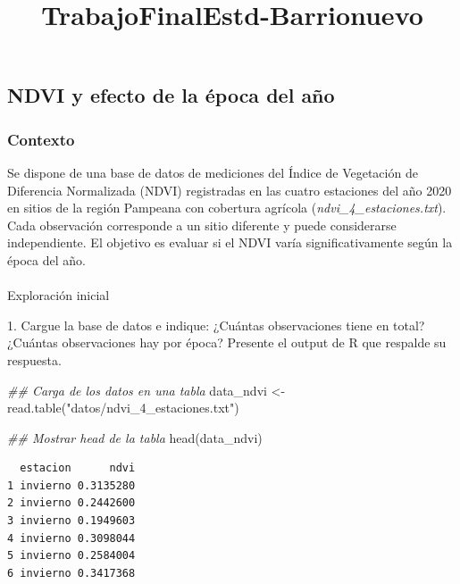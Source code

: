 \documentclass[
  letterpaper,
  DIV=11,
  numbers=noendperiod]{scrartcl}
\title{TrabajoFinalEstd-Barrionuevo}
\author{}
\date{}
\makeatletter
\let\oldparagraph\paragraph
\renewcommand{\paragraph}{
    \@ifstar
      \xxxParagraphStar
      \xxxParagraphNoStar
  }
\newcommand{\xxxParagraphStar}[1]{\oldparagraph*{#1}\mbox{}}
\newcommand{\xxxParagraphNoStar}[1]{\oldparagraph{#1}\mbox{}}
\newenvironment{Shaded}{\begin{snugshade}}{\end{snugshade}}
\newcommand{\DocumentationTok}[1]{\textcolor[rgb]{0.37,0.37,0.37}{\textit{#1}}}
\newcommand{\FunctionTok}[1]{\textcolor[rgb]{0.28,0.35,0.67}{#1}}
\newcommand{\NormalTok}[1]{\textcolor[rgb]{0.00,0.23,0.31}{#1}}
\newcommand{\OtherTok}[1]{\textcolor[rgb]{0.00,0.23,0.31}{#1}}
\newcommand{\StringTok}[1]{\textcolor[rgb]{0.13,0.47,0.30}{#1}}
\makeatother
\begin{document}
\maketitle


\subsection{NDVI y efecto de la época del
año}\label{ndvi-y-efecto-de-la-uxe9poca-del-auxf1o}

\subsubsection{Contexto}\label{contexto}

Se dispone de una base de datos de mediciones del Índice de Vegetación
de Diferencia Normalizada (NDVI) registradas en las cuatro estaciones
del año 2020 en sitios de la región Pampeana con cobertura agrícola
(\emph{ndvi\_4\_estaciones.txt}). Cada observación corresponde a un
sitio diferente y puede considerarse independiente. El objetivo es
evaluar si el NDVI varía significativamente según la época del año.

\paragraph{Exploración inicial}\label{exploraciuxf3n-inicial}

1. Cargue la base de datos e indique: ¿Cuántas observaciones tiene en
total? ¿Cuántas observaciones hay por época? Presente el output de R que
respalde su respuesta.

\begin{Shaded}
\begin{Highlighting}[]
\DocumentationTok{\#\# Carga de los datos en una tabla  }
\NormalTok{data\_ndvi }\OtherTok{\textless{}{-}} \FunctionTok{read.table}\NormalTok{(}\StringTok{"datos/ndvi\_4\_estaciones.txt"}\NormalTok{)}

\DocumentationTok{\#\# Mostrar head de la tabla}
\FunctionTok{head}\NormalTok{(data\_ndvi)}
\end{Highlighting}
\end{Shaded}

\begin{verbatim}
  estacion      ndvi
1 invierno 0.3135280
2 invierno 0.2442600
3 invierno 0.1949603
4 invierno 0.3098044
5 invierno 0.2584004
6 invierno 0.3417368
\end{verbatim}
\end{document}
